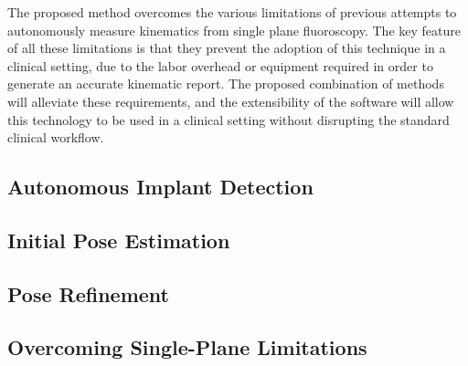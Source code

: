 The proposed method overcomes the various limitations of previous attempts to autonomously measure kinematics from single plane fluoroscopy. The key feature of all these limitations is that they prevent the adoption of this technique in a clinical setting, due to the labor overhead or equipment required in order to generate an accurate kinematic report. The proposed combination of methods will alleviate these requirements, and the extensibility of the software will allow this technology to be used in a clinical setting without disrupting the standard clinical workflow.

\subsection{Autonomous Implant Detection}
\label{sec:implant-detection}


\subsection{Initial Pose Estimation}
\label{sec:pose-estimation}


\subsection{Pose Refinement}
\label{sec:pose-refinement}

\subsection{Overcoming Single-Plane Limitations}
\label{sec:single-plane-limitations}
